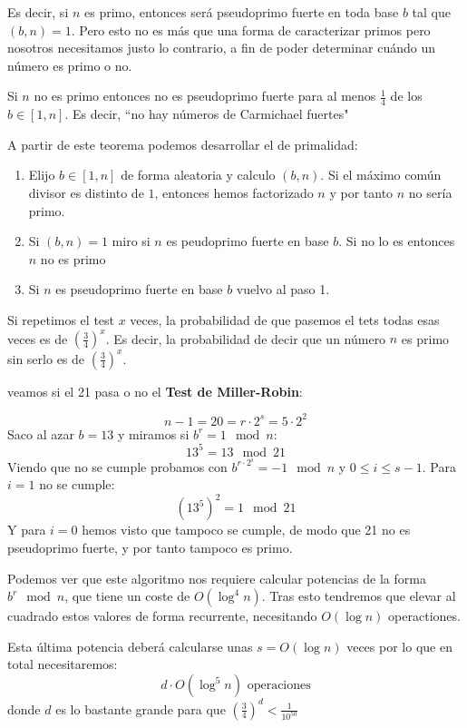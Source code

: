 Es decir, si $n$ es primo, entonces será pseudoprimo fuerte en toda base $b$ tal que $(b,n)=1$.
Pero esto no es más que una forma de caracterizar primos pero nosotros necesitamos justo lo contrario, a fin de poder determinar cuándo un número es primo o no.

\begin{theorem}
Si $n$ no es primo entonces no es pseudoprimo fuerte para al menos $\frac{1}{4}$ de los $b\in [1,n]$. Es decir, ``no hay números de Carmichael fuertes"
\end{theorem}

A partir de este teorema podemos desarrollar el  de primalidad:
\begin{enumerate}
\item Elijo $b\in[1,n]$ de forma aleatoria y calculo $(b,n)$. Si el máximo común divisor es distinto de $1$, entonces hemos factorizado $n$ y por tanto $n$ no sería primo.
\item Si $(b,n)=1$ miro si $n$ es peudoprimo fuerte en base $b$. Si no lo es entonces $n$ no es primo
\item Si $n$ es pseudoprimo fuerte en base $b$ vuelvo al paso 1.
\end{enumerate}

Si repetimos el test $x$ veces, la probabilidad de que pasemos el tets todas esas veces es de $\left(\frac{3}{4}\right)^x$. Es decir, la probabilidad de decir que un número $n$ es primo sin serlo es de $\left(\frac{3}{4}\right)^x$.

\begin{example}
	veamos si el 21 pasa o no el \textbf{Test de Miller-Robin}:

	\[n - 1 = 20 = r · 2^s = 5 · 2^2\]
	Saco al azar $b=13$ y miramos si $b^r = 1 \mod n$:
	\[13^5 = 13 \mod 21\]
	Viendo que no se cumple probamos con $b^{r·2^i}=-1 \mod n$ y $0≤i≤s-1$. Para $i=1$ no se cumple:
	\[(13^5)^2 = 1 \mod 21\]
	Y para $i=0$ hemos visto que tampoco se cumple, de modo que 21 no es pseudoprimo fuerte, y por tanto tampoco es primo.\\[3em]
\end{example}


Podemos ver que este algoritmo nos requiere calcular potencias de la forma $b^r \mod n$, que tiene un coste de $O(\log^4n)$. Tras esto tendremos que elevar al cuadrado estos valores de forma recurrente, necesitando $O(\log n)$ operactiones.

Esta última potencia deberá calcularse unas $s=O(\log n)$ veces por lo que en total necesitaremos:
\[d\cdot O(\log^5 n)\text{ operaciones}\]
donde $d$ es lo bastante grande para que $\left(\frac{3}{4}\right)^d < \frac{1}{10^{50}}$

